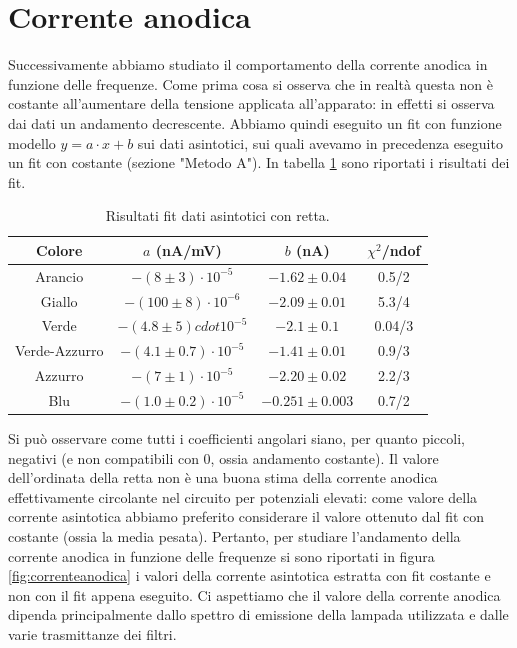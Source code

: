 \documentclass[10pt,a4paper]{article}
\begin{document}
\section{Corrente anodica}
Successivamente abbiamo studiato il comportamento della corrente anodica in funzione delle frequenze.
Come prima cosa si osserva che in realtà questa non è costante all'aumentare della tensione applicata all'apparato: in effetti si osserva dai dati un andamento decrescente. Abbiamo quindi eseguito un fit con funzione modello $y = a \cdot x + b$ sui dati asintotici, sui quali avevamo in precedenza eseguito un fit con costante (sezione "Metodo A").
In tabella \ref{tab:fitasintoticoretta} sono riportati i risultati dei fit.
\begin{table}[!htb]
\centering
\begin{tabular}{|c|c|c|c|}
\hline
Colore & $a$ (nA/mV) & $b$ (nA) & $\chi ^2$/ndof\\
\hline
Arancio & $-(8\pm 3)\cdot 10 ^ {-5}$ & $-1.62 \pm 0.04$ & 0.5/2\\
\hline
Giallo & $-(100\pm 8)\cdot 10 ^ {-6}$ & $-2.09\pm0.01$ & 5.3/4\\
\hline
Verde & $-(4.8\pm 5)cdot 10 ^ {-5}$ & $-2.1\pm 0.1$ & 0.04/3\\
\hline
Verde-Azzurro & $-(4.1\pm0.7)\cdot 10 ^ {-5}$ & $-1.41\pm0.01$ & 0.9/3\\
\hline
Azzurro & $-(7\pm 1)\cdot 10 ^ {-5}$ & $-2.20\pm 0.02$ & 2.2/3\\
\hline
Blu & $-(1.0\pm 0.2)\cdot 10 ^ {-5}$ & $-0.251\pm 0.003$ & 0.7/2\\ 
\hline
\end{tabular}
\caption{Risultati fit dati asintotici con retta.\label{tab:fitasintoticoretta}}
\end{table}
Si può osservare come tutti i coefficienti angolari siano, per quanto piccoli, negativi (e non compatibili con 0, ossia andamento costante).
Il valore dell'ordinata della retta non è una buona stima della corrente anodica effettivamente circolante nel circuito per potenziali elevati: come valore della corrente asintotica abbiamo preferito considerare il valore ottenuto dal fit con costante (ossia la media pesata).
Pertanto, per studiare l'andamento della corrente anodica in funzione delle frequenze si sono riportati in figura \ref{fig:correnteanodica} i valori della corrente asintotica estratta con fit costante e non con il fit appena eseguito. Ci aspettiamo che il valore della corrente anodica dipenda principalmente dallo spettro di emissione della lampada utilizzata e dalle varie trasmittanze dei filtri.
\end{document}
